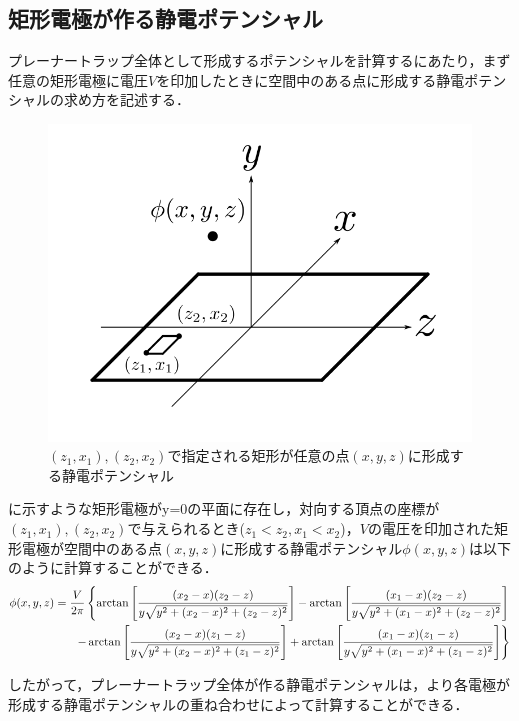 \subsection{矩形電極が作る静電ポテンシャル}
プレーナートラップ全体として形成するポテンシャルを計算するにあたり，まず任意の矩形電極に電圧$V$を印加したときに空間中のある点に形成する静電ポテンシャルの求め方を記述する．
\begin{figure}[h]
	\begin{center}
		\includegraphics[width = 0.5\linewidth]{./theory/figure/Potential_of_rect-electrode.png}
		\caption{$(z_1,x_1),(z_2,x_2)$で指定される矩形が任意の点$(x,y,z)$に形成する静電ポテンシャル}
		\label{fig:Potential_from_rect-electrode}
	\end{center}
\end{figure}

に示すような矩形電極がy=0の平面に存在し，対向する頂点の座標が$(z_1, x_1), (z_2, x_2)$で与えられるとき($z_1 < z_2, x_1 < x_2$)，$V$の電圧を印加された矩形電極が空間中のある点$(x,y,z)$に形成する静電ポテンシャル$\phi(x,y,z)$は以下のように計算することができる\cite{House_2008}．
\begin{align}\label{eq:rectangle_electrode}
	\phi(x,y,z) = \frac{V}{2\pi} \left\lbrace \arctan \left[ \frac{(x_2 - x)(z_2 - z)}{y\sqrt{y^2 + (x_2 - x)^2 + (z_2 - z)^2}}\right] - \arctan \left[ \frac{(x_1 - x)(z_2 - z)}{y\sqrt{y^2 + (x_1 - x)^2 + (z_2 - z)^2}} \right]  \right.  \notag \\ 
	\left. -\arctan \left[ \frac{(x_2 - x)(z_1 - z)}{y\sqrt{y^2 + (x_2 - x)^2 + (z_1 - z)^2}}\right] + \arctan \left[ \frac{(x_1 - x)(z_1 - z)}{y\sqrt{y^2 + (x_1 - x)^2 + (z_1 - z)^2}} \right]  \right\rbrace 
\end{align}

したがって，プレーナートラップ全体が作る静電ポテンシャルは，より各電極が形成する静電ポテンシャルの重ね合わせによって計算することができる．



